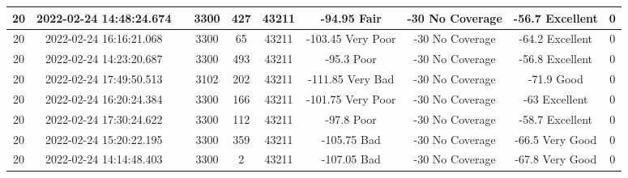 \begin{longtable*}{|c|c|c|c|c|c|c|c|c|c|}
20&2022-02-24 14:48:24.674&&3300&427&43211& -94.95    Fair        & -30       No Coverage & -56.7     Excellent   & 0\\\hline
{}20&2022-02-24 16:16:21.068&&3300&65&43211& -103.45   Very Poor   & -30       No Coverage & -64.2     Excellent   & 0\\\hline
{}20&2022-02-24 14:23:20.687&&3300&493&43211& -95.3     Poor        & -30       No Coverage & -56.8     Excellent   & 0\\\hline
{}20&2022-02-24 17:49:50.513&&3102&202&43211& -111.85   Very Bad    & -30       No Coverage & -71.9     Good        & 0\\\hline
{}20&2022-02-24 16:20:24.384&&3300&166&43211& -101.75   Very Poor   & -30       No Coverage & -63       Excellent   & 0\\\hline
{}20&2022-02-24 17:30:24.622&&3300&112&43211& -97.8     Poor        & -30       No Coverage & -58.7     Excellent   & 0\\\hline
{}20&2022-02-24 15:20:22.195&&3300&359&43211& -105.75   Bad         & -30       No Coverage & -66.5     Very Good   & 0\\\hline
{}20&2022-02-24 14:14:48.403&&3300&2&43211& -107.05   Bad         & -30       No Coverage & -67.8     Very Good   & 0\\\hline

\end{longtable*}
